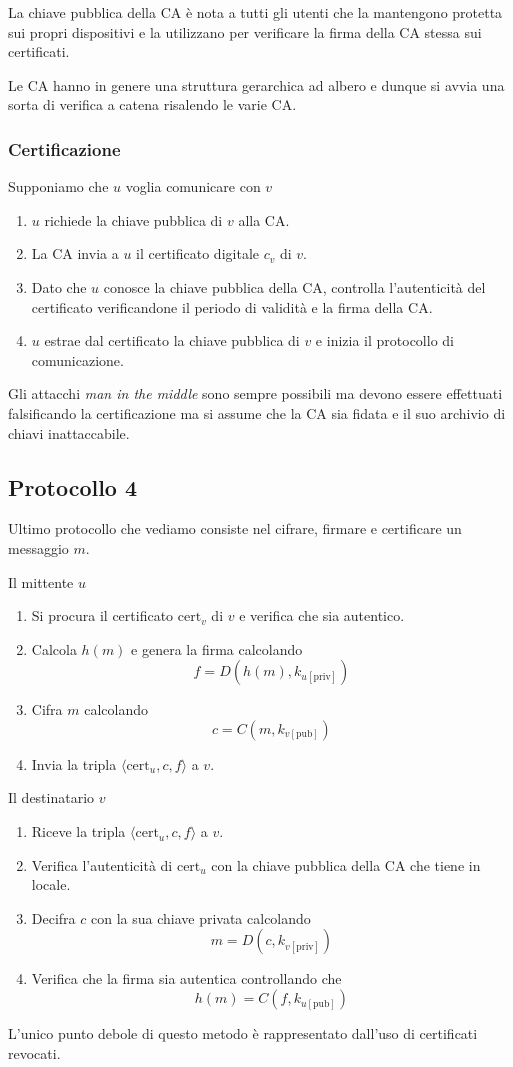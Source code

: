 La chiave pubblica della CA \`e nota a tutti gli utenti che la mantengono protetta sui propri dispositivi e la
utilizzano per verificare la firma della CA stessa sui certificati.

Le CA hanno in genere una struttura gerarchica ad albero e dunque si avvia una sorta di verifica a catena risalendo
le varie CA.

\subsubsection{Certificazione}
Supponiamo che $u$ voglia comunicare con $v$
\begin{enumerate}
	\item $u$ richiede la chiave pubblica di $v$ alla CA.
	\item La CA invia a $u$ il certificato digitale $c_v$ di $v$.
	\item Dato che $u$ conosce la chiave pubblica della CA, controlla l'autenticit\`a del certificato verificandone il
	      periodo di validit\`a e la firma della CA.
	\item $u$ estrae dal certificato la chiave pubblica di $v$ e inizia il protocollo di comunicazione.
\end{enumerate}
Gli attacchi \emph{man in the middle} sono sempre possibili ma devono essere effettuati falsificando la certificazione
ma si assume che la CA sia fidata e il suo archivio di chiavi inattaccabile.

\subsection{Protocollo 4}
Ultimo protocollo che vediamo consiste nel cifrare, firmare e certificare un messaggio $m$.

Il mittente $u$
\begin{enumerate}
	\item Si procura il certificato $\text{cert}_v$ di $v$ e verifica che sia autentico.
	\item Calcola $h(m)$ e genera la firma calcolando
	      \[ f = D(h(m), k_{u [\text{priv}]}) \]
	\item Cifra $m$ calcolando
	      \[ c = C(m, k_{v [\text{pub}]}) \]
	\item Invia la tripla $\langle \text{cert}_u, c, f \rangle$ a $v$.
\end{enumerate}
Il destinatario $v$
\begin{enumerate}
	\item Riceve la tripla $\langle \text{cert}_u, c, f \rangle$ a $v$.
	\item Verifica l'autenticit\`a di $\text{cert}_u$ con la chiave pubblica della CA che tiene in locale.
	\item Decifra $c$ con la sua chiave privata calcolando
	      \[ m = D(c, k_{v [\text{priv}]}) \]
	\item Verifica che la firma sia autentica controllando che
	      \[ h(m) = C(f, k_{u [\text{pub}]}) \]
\end{enumerate}
L'unico punto debole di questo metodo \`e rappresentato dall'uso di certificati revocati.

